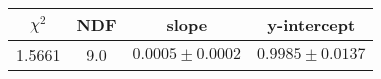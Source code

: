 \begin{tabular}{|c|c|c|c|}

\hline
$\chi^{2}$ & NDF & slope & y-intercept  \\
\hline
1.5661 & 9.0 & $0.0005\pm0.0002$ & $0.9985\pm0.0137$ \\
\hline

\end{tabular}